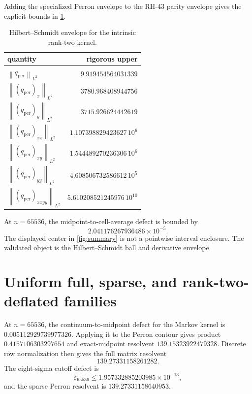 \documentclass[11pt]{article}
\theoremstyle{definition}
\theoremstyle{remark}
\newcommand{\norm}[1]{\left\lVert #1\right\rVert}
\begin{document}
Adding the specialized Perron envelope to the RH-43 parity envelope gives
the explicit bounds in \cref{tab:rank-two-envelope}.

\begin{table}[H]
\centering
\caption{Hilbert--Schmidt envelope for the intrinsic rank-two kernel.}
\label{tab:rank-two-envelope}
\begin{tabular}{@{}lr@{}}
\toprule
quantity & rigorous upper\\
\midrule
$\norm{q_{\mathrm{per}}}_{L^2}$ & $9.919454564031339$\\
$\norm{(q_{\mathrm{per}})_x}_{L^2}$ & $3780.968408944756$\\
$\norm{(q_{\mathrm{per}})_y}_{L^2}$ & $3715.926624442619$\\
$\norm{(q_{\mathrm{per}})_{xx}}_{L^2}$ & $1.107398829423627\,10^6$\\
$\norm{(q_{\mathrm{per}})_{xy}}_{L^2}$ & $1.544489270236306\,10^6$\\
$\norm{(q_{\mathrm{per}})_{yy}}_{L^2}$ & $4.608506732586612\,10^5$\\
$\norm{(q_{\mathrm{per}})_{xxyy}}_{L^2}$ & $5.610208521245976\,10^{10}$\\
\bottomrule
\end{tabular}
\end{table}

At $n=65536$, the midpoint-to-cell-average defect is bounded by
\begin{equation}
 2.041176267936486\times10^{-5}.
 \label{eq:rank-two-midpoint-defect}
\end{equation}
The displayed center in \cref{fig:summary} is not a pointwise interval
enclosure.  The validated object is the Hilbert--Schmidt ball and derivative
envelope.

\section{Uniform full, sparse, and rank-two-deflated families}
\label{sec:uniform}

At $n=65536$, the continuum-to-midpoint defect for the Markov kernel is
$0.005112929739977326$.  Applying it to the Perron contour gives product
$0.4157106303297654$ and exact-midpoint resolvent
$139.15323922479328$.  Discrete row normalization then gives the full
matrix resolvent
\begin{equation}
 139.27331158261282.
 \label{eq:perron-full-resolvent}
\end{equation}
The eight-sigma cutoff defect is
\[
 \varepsilon_{65536}
 \le1.957332885203985\times10^{-13},
\]
and the sparse Perron resolvent is
$139.27331158640953$.
\end{document}
